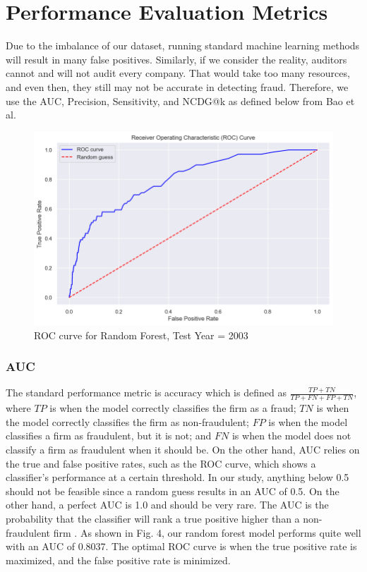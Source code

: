 \documentclass[conference]{IEEEtran}
\begin{document}
\section{Performance Evaluation Metrics}

Due to the imbalance of our dataset, running standard machine learning methods will result in many false positives. Similarly, if we consider the reality, auditors cannot and will not audit every company. That would take too many resources, and even then, they still may not be accurate in detecting fraud. Therefore, we use the AUC, Precision, Sensitivity, and NCDG@k as defined below from Bao et al. \vspace{10pt}\begin{figure}[!htbp]
	\centerline{\includegraphics[width=\columnwidth]{roc}}
	\caption{ROC curve for Random Forest, Test Year = 2003}
	\label{fig}
	\end{figure}\vspace{10pt}\subsubsection{AUC} The standard performance metric is accuracy which is defined as $\frac{TP+TN}{TP+FN+FP+TN}$, where $TP$ is when the model correctly classifies the firm as a fraud; $TN$ is when the model correctly classifies the firm as non-fraudulent; $FP$ is when the model classifies a firm as fraudulent, but it is not; and $FN$ is when the model does not classify a firm as fraudulent when it should be. On the other hand, AUC relies on the true and false positive rates, such as the ROC curve, which shows a classifier's performance at a certain threshold. In our study, anything below 0.5 should not be feasible since a random guess results in an AUC of 0.5. On the other hand, a perfect AUC is 1.0 and should be very rare. The AUC is the probability that the classifier will rank a true positive higher than a non-fraudulent firm \cite{b9}. As shown in Fig. 4, our random forest model performs quite well with an AUC of 0.8037. The optimal ROC curve is when the true positive rate is maximized, and the false positive rate is minimized.
\end{document}
